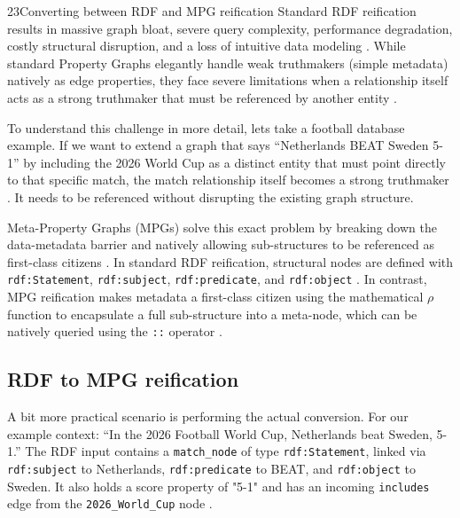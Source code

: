 \begin{question}{2}{3}{Converting between RDF and MPG reification}
Standard RDF reification results in massive graph bloat, severe query complexity, performance degradation, costly structural disruption, and a loss of intuitive data modeling \cite{hernandez_reifying_nodate}. While standard Property Graphs elegantly handle weak truthmakers (simple metadata) natively as edge properties, they face severe limitations when a relationship itself acts as a strong truthmaker that must be referenced by another entity \cite{guarino_reification_2018}. 

To understand this challenge in more detail, lets take a football database example. If we want to extend a graph that says ``Netherlands BEAT Sweden 5-1'' by including the 2026 World Cup as a distinct entity that must point directly to that specific match, the match relationship itself becomes a strong truthmaker \cite{guarino_reification_2018}. It needs to be referenced without disrupting the existing graph structure.

Meta-Property Graphs (MPGs) solve this exact problem by breaking down the data-metadata barrier and natively allowing sub-structures to be referenced as first-class citizens \cite{sadoughi_meta-property_2025}. In standard RDF reification, structural nodes are defined with \texttt{rdf:Statement}, \texttt{rdf:subject}, \texttt{rdf:predicate}, and \texttt{rdf:object} \cite{cyganiak_rdf_2014}. In contrast, MPG reification makes metadata a first-class citizen using the mathematical $\rho$ function to encapsulate a full sub-structure into a meta-node, which can be natively queried using the \texttt{::} operator \cite{sadoughi_meta-property_2025}.

\subsection{RDF to MPG reification}

A bit more practical scenario is performing the actual conversion. For our example context: ``In the 2026 Football World Cup, Netherlands beat Sweden, 5-1.'' The RDF input contains a \texttt{match\_node} of type \texttt{rdf:Statement}, linked via \texttt{rdf:subject} to Netherlands, \texttt{rdf:predicate} to BEAT, and \texttt{rdf:object} to Sweden. It also holds a score property of "5-1" and has an incoming \texttt{includes} edge from the \texttt{2026\_World\_Cup} node \cite{hernandez_reifying_nodate}.


\end{question}
